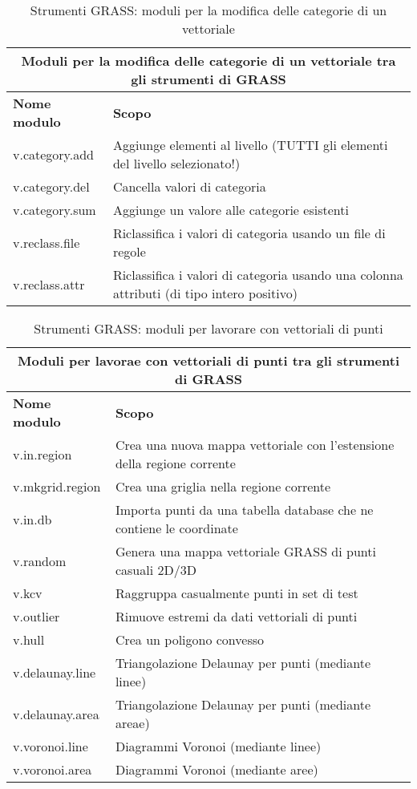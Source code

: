 \begin{table}[ht]
\centering
\caption{Strumenti GRASS: moduli per la modifica delle categorie di un vettoriale}\medskip
 \begin{tabular}{|p{4cm}|p{12cm}|}
  \hline \multicolumn{2}{|c|}{\textbf{Moduli per la modifica delle categorie di un vettoriale tra gli strumenti di GRASS}} \\
  \hline \textbf{Nome modulo} & \textbf{Scopo} \\
  \hline v.category.add & Aggiunge elementi al livello (TUTTI gli elementi del livello selezionato!) \\
  \hline v.category.del & Cancella valori di categoria \\
  \hline v.category.sum & Aggiunge un valore alle categorie esistenti \\
  \hline v.reclass.file & Riclassifica i valori di categoria usando un file di regole \\
  \hline v.reclass.attr & Riclassifica i valori di categoria usando una colonna attributi (di tipo intero positivo) \\
\hline
\end{tabular}
\end{table}

\begin{table}[ht]
\centering
\caption{Strumenti GRASS: moduli per lavorare con vettoriali di punti}\medskip
 \begin{tabular}{|p{4cm}|p{12cm}|}
  \hline \multicolumn{2}{|c|}{\textbf{Moduli per lavorae con vettoriali di punti tra gli strumenti di GRASS}} \\
  \hline \textbf{Nome modulo} & \textbf{Scopo} \\
  \hline v.in.region & Crea una nuova mappa vettoriale con l'estensione della regione corrente \\
  \hline v.mkgrid.region & Crea una griglia nella regione corrente \\
  \hline v.in.db & Importa punti da una tabella database che ne contiene le coordinate \\
  \hline v.random & Genera una mappa vettoriale GRASS di punti casuali 2D/3D \\
  \hline v.kcv & Raggruppa casualmente punti in set di test \\
  \hline v.outlier & Rimuove estremi da dati vettoriali di punti \\
  \hline v.hull & Crea un poligono convesso \\
  \hline v.delaunay.line & Triangolazione Delaunay per punti (mediante linee) \\
  \hline v.delaunay.area & Triangolazione Delaunay per punti (mediante areae) \\
  \hline v.voronoi.line & Diagrammi Voronoi (mediante linee) \\
  \hline v.voronoi.area & Diagrammi Voronoi (mediante aree) \\
\hline
\end{tabular}
\end{table}


